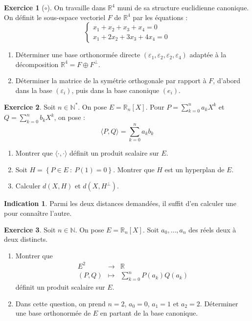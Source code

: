 \documentclass[french]{book}
\newcommand{\N}{\mathbb{N}}
\newcommand{\R}{\mathbb{R}}
\newcommand{\st}{^*}
\theoremstyle{definition}
\newtheorem{ex}{Exercice}[chapter]
\theoremstyle{theorem}
\newtheorem*{ind}{Indication}
\theoremstyle{remark}
\begin{document}
\begin{ex}[$\circ$]
	On travaille dans $\R^4$ muni de sa structure euclidienne canonique. On définit le sous-espace vectoriel $F$ de $\R^4$ par les équations : $$\begin{cases}
		x_1+x_2+x_3+x_4=0 \\
		x_1+2x_2+3x_3+4x_4=0
	\end{cases}$$
	\begin{enumerate}
		\item Déterminer une base orthonormée directe $(\varepsilon_1,\varepsilon_2,\varepsilon_2,\varepsilon_4)$ adaptée à la décomposition $\R^4=F\oplus F^\bot$.
		\item Déterminer la matrice de la symétrie orthogonale par rapport à $F$, d'abord dans la base $(\varepsilon_i)$, puis dans la base canonique $(e_i)$.
	\end{enumerate}
\end{ex}

\begin{ex}
	Soit $n\in\N\st$. On pose $E=\R_n[X]$. Pour $P=\displaystyle\sum_{k=0}^{n}a_kX^k$ et $Q=\displaystyle\sum_{k=0}^{n}b_kX^k$, on pose : $$\langle P,Q\rangle=\sum_{k=0}^{n}a_k b_k$$
	\begin{enumerate}
		\item Montrer que $\langle\cdot,\cdot\rangle$ définit un produit scalaire sur $E$.
		\item Soit $H=\left\{P\in E\ : \ P(1)=0\right\}$. Montrer que $H$ est un hyperplan de $E$.
		\item Calculer $d(X,H)$ et $d(X,H^\bot)$.
	\end{enumerate}
\end{ex}

\begin{ind}
	Parmi les deux distances demandées, il suffit d'en calculer une pour connaître l'autre.
\end{ind}

\begin{ex}
	Soit $n\in\N$. On pose $E=\R_n[X]$. Soit $a_0,\ldots,a_n$ des réels deux à deux distincts.
	\begin{enumerate}
		\item Montrer que $$\begin{array}{rcl}
			E^2&\longrightarrow&\R\\
			(P,Q)&\longmapsto&\displaystyle\sum_{k=0}^{n}P(a_k)Q(a_k)
		\end{array}$$ définit un produit scalaire sur $E$.
		\item Dans cette question, on prend $n=2$, $a_0=0$, $a_1=1$ et $a_2=2$. Déterminer une base orthonormée de $E$ en partant de la base canonique.
	\end{enumerate}
\end{ex}
\end{document}
